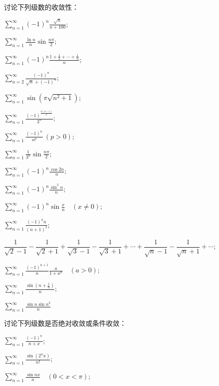 \begin{xiti}
\item 讨论下列级数的收敛性：
\begin{ziti}
\item $\displaystyle\sum_{n=1}^{\infty}(-1)^{n}\frac{\sqrt{n}}{n+100}$;
\item $\displaystyle\sum_{n=1}^{\infty}\frac{\ln n}{n}\sin\frac{n\pi}{2}$;
\item $\displaystyle\sum_{n=1}^{\infty}(-1)^{n}\frac{1+\frac{1}{2}+\cdots+\frac{1}{n}}{n}$;
\item $\displaystyle\sum_{n=2}^{\infty}\frac{(-1)^{n}}{\sqrt{n}+(-1)^{n}}$;
\item $\displaystyle\sum_{n=1}^{\infty}\sin(\pi\sqrt{n^{2}+1})$;
\item $\displaystyle\sum_{n=1}^{\infty}\frac{(-1)^{\frac{n(n-1)}{2}}}{3^{n}}$;
\item $\displaystyle\sum_{n=1}^{\infty}\frac{(-1)^{n}}{n^{p}}\ (p>0)$;
\item $\displaystyle\sum_{n=1}^{\infty}\frac{1}{3^{n}}\sin\frac{n\pi}{2}$;
\item $\displaystyle\sum_{n=1}^{\infty}(-1)^{n}\frac{\cos 2n}{n}$;
\item $\displaystyle\sum_{n=1}^{\infty}(-1)^{n}\frac{\sin^{2}n}{n}$;
\item $\displaystyle\sum_{n=1}^{\infty}(-1)^{n}\sin\frac{x}{n}\quad(x\neq0)$;
\item $\displaystyle\sum_{n=1}^{\infty}\frac{(-1)^{n}n}{(n+1)^{2}}$;
\item $\dfrac{1}{\sqrt{2}-1}-\dfrac{1}{\sqrt{2}+1}+\dfrac{1}{\sqrt{3}-1}-\dfrac{1}{\sqrt{3}+1}+\cdots+\dfrac{1}{\sqrt{n}-1}-\dfrac{1}{\sqrt{n}+1}+\cdots$;
\item $\displaystyle\sum_{n=1}^{\infty}\frac{(-1)^{n+1}}{n}\frac{a}{1+a^n}\quad(a>0)$;
\item $\displaystyle\sum_{n=1}^{\infty}\frac{\sin\left(n+\frac{1}{n}\right)}{n}$;
\item $\displaystyle\sum_{n=1}^{\infty}\frac{\sin n\sin n^{2}}{n}$
\end{ziti}
\item 讨论下列级数是否绝对收敛或条件收敛：
\begin{ziti}
\item $\displaystyle\sum_{n=1}^{\infty}\frac{(-1)^{n}}{n+x}$;
\item $\displaystyle\sum_{n=1}^{\infty}\frac{\sin(2^{n}x)}{n!}$;
\item $\displaystyle\sum_{n=1}^{\infty}\frac{\sin nx}{n}\quad(0<x<\pi)$;

\end{ziti}
\end{xiti}
